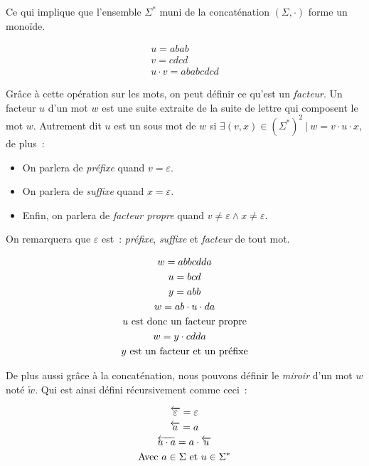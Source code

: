 \noindent Ce qui implique que l'ensemble \(\Sigma ^ *\) muni de la concaténation
\((\Sigma, \cdot)\) forme un monoïde.

\begin{example}
    \begin{gather}
        u = abab \\
        v = cdcd \\
        u \cdot v = ababcdcd
    \end{gather}
\end{example}

Grâce à cette opération sur les mots, on peut définir ce qu'est un
\textit{facteur}. Un facteur \(u\) d'un mot \(w\) est une suite extraite de la
suite de lettre qui composent le mot \(w\). Autrement dit \(u\) est un sous mot
de \(w\) si \(\exists (v, x) \in (\Sigma ^ *)^2 ~|~ w = v \cdot u \cdot x\), de
plus~:

\begin{itemize}[label=\textbullet]
    \item On parlera de \textit{préfixe} quand \(v = \varepsilon\).
    \item On parlera de \textit{suffixe} quand \(x = \varepsilon\).
    \item Enfin, on parlera de \textit{facteur propre} quand \(v \neq \varepsilon \land x
          \neq \varepsilon\).
\end{itemize}

\noindent On remarquera que \(\varepsilon\) est~: \textit{préfixe}, \textit{suffixe} et
\textit{facteur} de tout mot.

\begin{example}
    \begin{gather}
        w = abbcdda \\
        u = bcd \\
        y = abb \\
        w = ab \cdot u \cdot da\\
        u \text{ est donc un facteur propre} \notag \\
        w = y \cdot cdda \quad \\
        y \text{ est un facteur et un préfixe} \notag
    \end{gather}
\end{example}

De plus aussi grâce à la concaténation, nous pouvons définir le \textit{miroir}
d'un mot \(w\) noté \(\overleftarrow{w}\). Qui est ainsi défini récursivement
comme ceci~:

\begin{gather}
    \overleftarrow{\varepsilon} = \varepsilon \\
    \overleftarrow{a} = a \\
    \overleftarrow{u \cdot a} = a \cdot \overleftarrow{u} \\
    \text{Avec } a \in \Sigma \text{ et } u \in \Sigma ^ * \notag
\end{gather}

